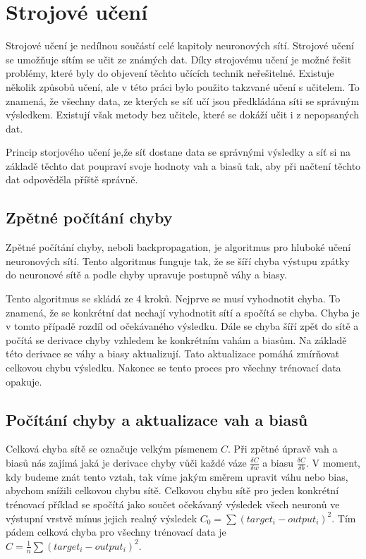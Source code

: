 \section{Strojové učení}
Strojové učení je nedílnou součástí celé kapitoly neuronových sítí. Strojové učení se umožňuje sítím se učit ze známých dat.
Díky strojovému učení je možné řešit problémy, které byly do objevení těchto učících technik neřešitelné.
Existuje několik způsobů učení, ale v této práci bylo použito takzvané učení s učitelem.
To znamená, že všechny data, ze kterých se síť učí jsou předkládána síti se správným výsledkem.
Existují však metody bez učitele, které se dokáží učit i z nepopsaných dat.

Princip storjového učení je,že síť dostane data se správnými výsledky a síť si na základě těchto dat poupraví svoje hodnoty vah a biasů tak,
aby při načtení těchto dat odpověděla příště správně.

\subsection{Zpětné počítání chyby}
Zpětné počítání chyby\cite{backpropagation}, neboli backpropagation, je algoritmus pro hluboké učení neuronových sítí.
Tento algoritmus funguje tak, že se šíří chyba výstupu zpátky do neuronové sítě a podle chyby upravuje postupně váhy a biasy.

Tento algoritmus se skládá ze 4 kroků. Nejprve se musí vyhodnotit chyba. To znamená, že se konkrétní dat nechají vyhodnotit sítí a spočítá se chyba.
Chyba je v tomto případě rozdíl od očekávaného výsledku. Dále se chyba šíří zpět do sítě a počítá se derivace chyby vzhledem ke konkrétním vahám a biasům.
Na základě této derivace se váhy a biasy aktualizují. Tato aktualizace pomáhá zmírňovat celkovou chybu výsledku. Nakonec se tento proces pro všechny trénovací data opakuje.

\subsection{Počítání chyby a aktualizace vah a biasů}
Celková chyba sítě se označuje velkým písmenem \(C\). Při zpětné úpravě vah a biasů nás zajímá jaká je derivace chyby vůči každé váze \(\frac{\delta C}{\delta w}\) a biasu \(\frac{\delta C}{\delta b}\).
V moment, kdy budeme znát tento vztah, tak víme jakým směrem upravit váhu nebo bias, abychom snížili celkovou chybu sítě.
Celkovou chybu sítě pro jeden konkrétní trénovací příklad se spočítá jako součet očekávaný výsledek všech neuronů ve výstupní vrstvě mínus jejich realný výsledek \(C_0 = \sum (target_i - output_i)^2 \).
Tím pádem celková chyba pro všechny trénovací data je \(C = \frac{1}{n}\sum (target_i - output_i)^2 \).


